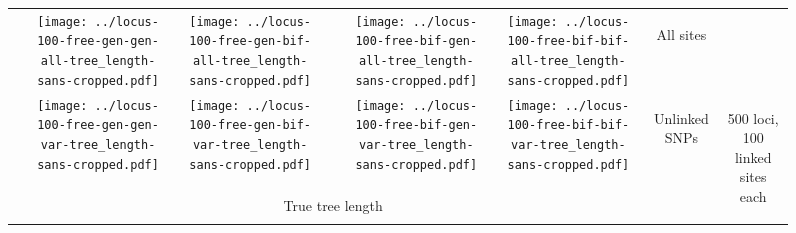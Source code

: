 \documentclass[border=10pt,varwidth=30cm]{standalone}
\begin{document}
\begin{figure}
\begin{tabular}{@{}cccccccc@{}}
        & \texttt{[image: ../locus-100-free-gen-gen-all-tree\_length-sans-cropped.pdf]}
        & \texttt{[image: ../locus-100-free-gen-bif-all-tree\_length-sans-cropped.pdf]}
        &
        & \texttt{[image: ../locus-100-free-bif-gen-all-tree\_length-sans-cropped.pdf]}
        & \texttt{[image: ../locus-100-free-bif-bif-all-tree\_length-sans-cropped.pdf]}
        & \multicolumn{1}{c|}{\multirow{1}{*}[9em]{\begin{sideways}\Large All sites\end{sideways}}}
        & \\
        & \texttt{[image: ../locus-100-free-gen-gen-var-tree\_length-sans-cropped.pdf]}
        & \texttt{[image: ../locus-100-free-gen-bif-var-tree\_length-sans-cropped.pdf]}
        &
        & \texttt{[image: ../locus-100-free-bif-gen-var-tree\_length-sans-cropped.pdf]}
        & \texttt{[image: ../locus-100-free-bif-bif-var-tree\_length-sans-cropped.pdf]}
        & \multicolumn{1}{c|}{\multirow{1}{*}[10em]{\begin{sideways}\Large Unlinked SNPs\end{sideways}}}
        & \multirow{2}{*}[23em]{\begin{sideways}\LARGE 500 loci, 100 linked sites each\end{sideways}} \\
        & \multicolumn{5}{c}{\Large True tree length} & & \\
    \end{tabular}
\end{figure}
\end{document}
